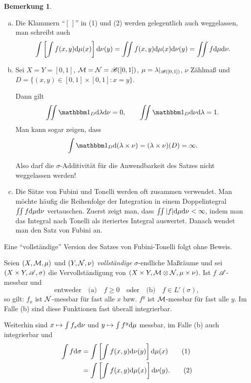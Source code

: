 \documentclass[
 a4paper,
 12pt,
 parskip=half
 ]{scrreprt}
\theoremstyle{plain}
\theoremstyle{definition}
\newtheorem{rmrk}[thm]{Bemerkung}
\numberwithin{equation}{section}
\begin{document}
\begin{rmrk}
 \begin{enumerate}[(a)]
  \item Die Klammern ``$[\,]$'' in (1) und (2) werden gelegentlich auch weggelassen, man schreibt auch
   \[ \int \left[ \int f(x,y) \mathrm{d} \mu(x) \right] \mathrm{d} \nu(y) 
      = \iint f(x,y) \mathrm{d} \mu(x) \mathrm{d} \nu(y)
      = \iint f \mathrm{d} \mu \mathrm{d} \nu. \]
  \item Sei $X = Y = [0,1]$, $\mathcal{M} = \mathcal{N} = \mathscr{B}([0,1])$, $\mu = \lambda |_{\mathscr{B}([0,1])}$, $\nu$ Zählmaß und $D = \{ (x,y) \in [0,1] \times [0,1] : x = y \}$. 
  
  Dann gilt 
  \[ \iint \ind_D \diffop \lambda \diffop \nu = 0, \qquad \iint \ind_D \diffop \nu \diffop \lambda = 1. \]
  Man kann sogar zeigen, dass
  \[ \int \ind_D \diffop (\lambda \times \nu) = (\lambda \times \nu)(D) = \infty. \]
  
  Also darf die $\sigma$-Additivität für die Anwendbarkeit des Satzes nicht weggelassen werden!
  \item Die Sätze von Fubini und Tonelli werden oft zusammen verwendet. Man möchte häufig die Reihenfolge der Integration in einem Doppelintegral $\iint f \mathrm{d} \mu \mathrm{d} \nu$ vertauschen. Zuerst zeigt man, dass $\iint |f| \mathrm{d} \mu \mathrm{d} \nu < \infty$, indem man das Integral nach Tonelli als iteriertes Integral auswertet. Danach wendet man den Satz von Fubini an.
 \end{enumerate}
\end{rmrk}

Eine ``vollständige'' Version des Satzes von Fubini-Tonelli folgt ohne Beweis.
\begin{thm}
 Seien $(X, \mathcal{M}, \mu)$ und $(Y, \mathcal{N}, \nu)$ \emph{vollständige} $\sigma$-endliche Maßräume und sei $(X \times Y, \mathscr{A}, \sigma)$ die Vervollständigung von $(X \times Y, \mathcal{M} \otimes \mathcal{N}, \mu \times \nu)$. Ist $f$ $\mathscr{A}$-messbar und 
 \[ \text{entweder} \quad \text{(a)} \quad f \ge 0 \quad \text{oder} \quad \text{(b)} \quad f \in L'(\sigma), \] 
 so gilt: $f_x$ ist $\mathcal{N}$-messbar für fast alle $x$ bzw. $f^y$ ist $\mathcal{M}$-messbar für fast alle $y$. Im Falle (b) sind diese Funktionen fast überall integrierbar.
 
 Weiterhin sind $x \mapsto \int f_x \mathrm{d} \nu$ und $y \mapsto \int f^y \mathrm{d} \mu$ messbar, im Falle (b) auch integrierbar und
 \begin{align*}
  \int f \mathrm{d} \sigma
  &= \int \left[ \int f(x,y) \mathrm{d} \nu(y) \right] \mathrm{d} \mu(x) \tag{1}\\
  &= \int \left[ \int f(x,y) \mathrm{d} \mu(x) \right] \mathrm{d} \nu(y). \tag{2}
 \end{align*}
\end{thm}
\end{document}
